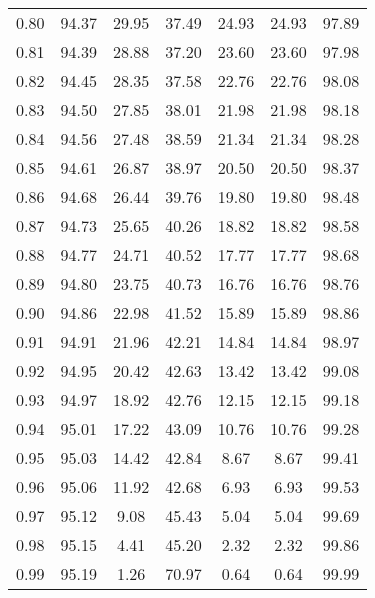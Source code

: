 \begin{tabular}{|c|c|c|c|c|c|c|}
      0.80 &     94.37 &     29.95 &      37.49 &   24.93 &      24.93 &         97.89 \\
      0.81 &     94.39 &     28.88 &      37.20 &   23.60 &      23.60 &         97.98 \\
      0.82 &     94.45 &     28.35 &      37.58 &   22.76 &      22.76 &         98.08 \\
      0.83 &     94.50 &     27.85 &      38.01 &   21.98 &      21.98 &         98.18 \\
      0.84 &     94.56 &     27.48 &      38.59 &   21.34 &      21.34 &         98.28 \\
      0.85 &     94.61 &     26.87 &      38.97 &   20.50 &      20.50 &         98.37 \\
      0.86 &     94.68 &     26.44 &      39.76 &   19.80 &      19.80 &         98.48 \\
      0.87 &     94.73 &     25.65 &      40.26 &   18.82 &      18.82 &         98.58 \\
      0.88 &     94.77 &     24.71 &      40.52 &   17.77 &      17.77 &         98.68 \\
      0.89 &     94.80 &     23.75 &      40.73 &   16.76 &      16.76 &         98.76 \\
      0.90 &     94.86 &     22.98 &      41.52 &   15.89 &      15.89 &         98.86 \\
      0.91 &     94.91 &     21.96 &      42.21 &   14.84 &      14.84 &         98.97 \\
      0.92 &     94.95 &     20.42 &      42.63 &   13.42 &      13.42 &         99.08 \\
      0.93 &     94.97 &     18.92 &      42.76 &   12.15 &      12.15 &         99.18 \\
      0.94 &     95.01 &     17.22 &      43.09 &   10.76 &      10.76 &         99.28 \\
      0.95 &     95.03 &     14.42 &      42.84 &    8.67 &       8.67 &         99.41 \\
      0.96 &     95.06 &     11.92 &      42.68 &    6.93 &       6.93 &         99.53 \\
      0.97 &     95.12 &      9.08 &      45.43 &    5.04 &       5.04 &         99.69 \\
      0.98 &     95.15 &      4.41 &      45.20 &    2.32 &       2.32 &         99.86 \\
      0.99 &     95.19 &      1.26 &      70.97 &    0.64 &       0.64 &         99.99 \\
\bottomrule
\end{tabular}
